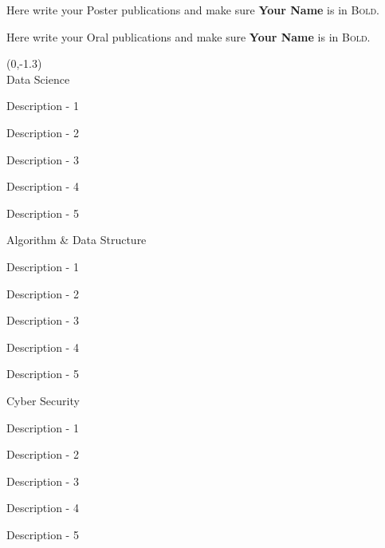 \documentclass[11pt, a4paper]{resume-lab}
\begin{document}
\begin{Parallel}[v]{0.265\textwidth}{0.66\textwidth}
{\begin{cvletter}
Here write your Poster publications and make sure \textbf{Your Name} is in \textsc{Bold}.

Here write your Oral publications and make sure \textbf{Your Name} is in \textsc{Bold}.

\end{cvletter}

\begin{textblock}{2}(0,-1.3)
	\vspace{5mm}\\
	\skillsection
	{Data Science}
	{
		\begin{skillitems} %
			\item {Description - 1}
			\item {Description - 2}
			\item {Description - 3}
			\item {Description - 4}
			\item {Description - 5}
		\end{skillitems}
	}

	\skillsection
	{Algorithm \& Data Structure}
	{
		\begin{skillitems} %
			\item {Description - 1}
			\item {Description - 2}
			\item {Description - 3}
			\item {Description - 4}
			\item {Description - 5}
		\end{skillitems}
	}
	
	\skillsection
	{Cyber Security}
	{
		\begin{skillitems} %
			\item {Description - 1}
			\item {Description - 2}
			\item {Description - 3}
			\item {Description - 4}
			\item {Description - 5}
		\end{skillitems}
	}
	

\end{textblock}}
\end{Parallel}
\end{document}
